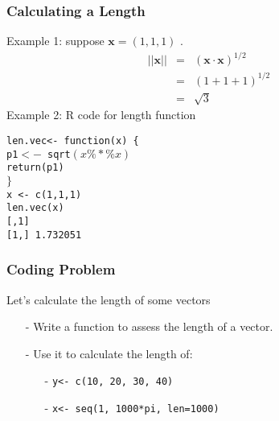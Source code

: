 \documentclass{beamer}
\numberwithin{equation}{section}
\begin{document}
\begin{frame}
\frametitle{Calculating a Length}

Example 1: suppose $\boldsymbol{x} = (1, 1, 1)$  .  
\begin{eqnarray}
||\boldsymbol{x} ||& = & (\boldsymbol{x} \cdot \boldsymbol{x} )^{1/2} \nonumber \\
							& = & (1 + 1 + 1)^{1/2} \nonumber \\
							& = & \sqrt{3} \nonumber 
\end{eqnarray}							
Example 2: R code for length function


{\tt len.vec<- function(x) \{ } \\

{\tt 		p1$<-$ sqrt$(x\%*\%x)$ } \\
{\tt return(p1) } \\
{\tt $\}$ }\\

{\tt x <- c(1,1,1) } \\
{\tt len.vec(x) } \\
{\tt           [,1]} \\
{\tt [1,] 1.732051  } \\


\end{frame}


\begin{frame}
\frametitle{Coding Problem}

Let's calculate the length of some vectors\\
\begin{itemize}
\item[-] Write a function to assess the length of a vector.  
\item[-] Use it to calculate the length of:
\begin{itemize}
\item[-] {\tt y<- c(10, 20, 30, 40)} 
\item[-] {\tt x<- seq(1, 1000*pi, len=1000) } 
\end{itemize}
\end{itemize}

\end{frame}
\end{document}
